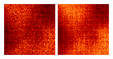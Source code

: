 \documentclass[tocnosub,noragright,centerchapter,12pt]{uiucecethesis09}
\begin{document}
\begin{figure}
{\begin{minipage}{.19\textwidth}
  \end{minipage}%
  \begin{minipage}{.19\textwidth}
    \centering
    \includegraphics[width=.95\textwidth]{figures/aia_recon_zoom20.png}
  \end{minipage}%
  \begin{minipage}{.19\textwidth}
    \centering
    \includegraphics[width=.95\textwidth]{figures/aia_recon_zoom50.png}

\end{minipage}}
\end{figure}
\end{document}
